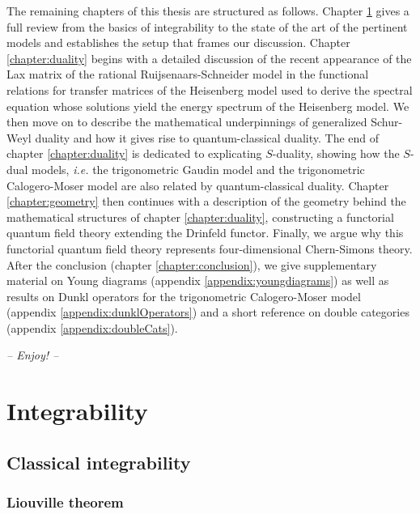 \documentclass[11pt]{report}
\theoremstyle{definition}
\theoremstyle{remark}
\theoremstyle{remark}
\begin{document}
The remaining chapters of this thesis are structured as follows. Chapter \ref{chapter:integrability} gives a full review from the basics of integrability to the state of the art of the pertinent models and establishes the setup that frames our discussion. Chapter \ref{chapter:duality} begins with a detailed discussion of the recent appearance of the Lax matrix of the rational Ruijsenaars-Schneider model in the functional relations for transfer matrices of the Heisenberg model used to derive the spectral equation whose solutions yield the energy spectrum of the Heisenberg model. We then move on to describe the mathematical underpinnings of generalized Schur-Weyl duality and how it gives rise to quantum-classical duality. The end of chapter \ref{chapter:duality} is dedicated to explicating $S$-duality, showing how the $S$-dual models, \emph{i.e.} the trigonometric Gaudin model and the trigonometric Calogero-Moser model are also related by quantum-classical duality. Chapter \ref{chapter:geometry} then continues with a description of the geometry behind the mathematical structures of chapter \ref{chapter:duality}, constructing a functorial quantum field theory extending the Drinfeld functor. Finally, we argue why this functorial quantum field theory represents four-dimensional Chern-Simons theory. After the conclusion (chapter \ref{chapter:conclusion}), we give supplementary material on Young diagrams (appendix \ref{appendix:youngdiagrams}) as well as results on Dunkl operators for the trigonometric Calogero-Moser model (appendix \ref{appendix:dunklOperators}) and a short reference on double categories (appendix \ref{appendix:doubleCats}).
~\\
\begin{center}
{\large \textit{-- Enjoy! --}}
\end{center}


\chapter{Integrability}\label{chapter:integrability}

\section{Classical integrability}

\subsection{Liouville theorem}
\end{document}

